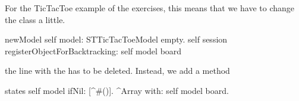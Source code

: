 \documentclass[a4paper,10pt,twoside]{book}
\begin{document}
For the TicTacToe example of the exercises, this means that we have to change
the class  a little.

\begin{code}
newModel
	self model: STTicTacToeModel empty.
	self session registerObjectForBacktracking: self model board
\end{code}

the line with the  has to be deleted. Instead, we add a method 

\begin{code}
states
	self model ifNil: [^#()].
	^Array with: self model board.
\end{code}




\ifx\wholebook\relax\else 
   
   
\end{document}
